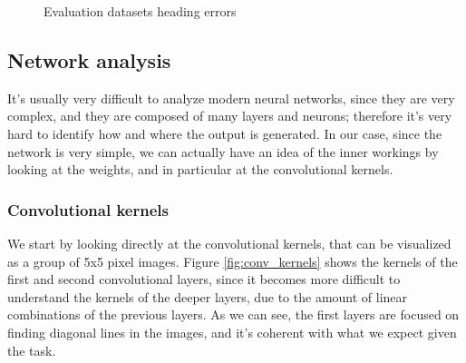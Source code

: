 \documentclass[a4paper,12pt,sort&compress]{article}
\begin{document}
\begin{figure}
    \centering
    \caption{Evaluation datasets heading errors}
    \label{fig:dataset_analysis2}
\end{figure}

\pagebreak

\subsection{Network analysis}
    It's usually very difficult to analyze modern neural networks, since they are very complex, and
    they are composed of many layers and neurons; therefore it's very hard to identify how and where
    the output is generated. In our case, since the network is very simple, we can actually have an
    idea of the inner workings by looking at the weights, and in particular at the convolutional
    kernels.  

\subsubsection*{Convolutional kernels}
    We start by looking directly at the convolutional kernels, that can be visualized as a group of 5x5 pixel
    images. Figure \ref{fig:conv_kernels} shows the kernels of the first and second convolutional
    layers, since it becomes more difficult to understand the kernels of the deeper layers, due to
    the amount of linear combinations of the previous layers. As we can see, the first layers are
    focused on finding diagonal lines in the images, and it's coherent with what we expect given the
    task.
    
\end{document}
